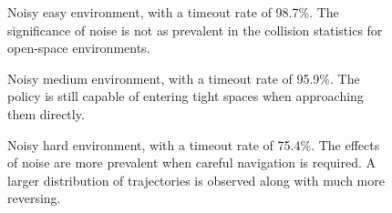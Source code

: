 \begin{figure}[htb]
    \centering
    \caption{Noisy easy environment, with a timeout rate of 98.7\%. The significance of noise is not as prevalent in the collision statistics for open-space environments.}
    \label{fig:7_easy_random}
\end{figure}
\begin{figure}[htbp]
    \centering
    \caption{Noisy medium environment, with a timeout rate of 95.9\%. The policy is still capable of entering tight spaces when approaching them directly.}
    \label{fig:7_medium_random}
    \centering
    \caption{Noisy hard environment, with a timeout rate of 75.4\%. The effects of noise are more prevalent when careful navigation is required. A larger distribution of trajectories is observed along with much more reversing.}
    \label{fig:7_hard_random}
\end{figure}
